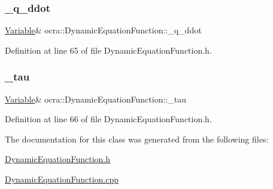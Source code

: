 \subsubsection{\texorpdfstring{\+\_\+q\+\_\+ddot}{\_q\_ddot}}
{\footnotesize\ttfamily \hyperlink{classocra_1_1Variable}{Variable}\& ocra\+::\+Dynamic\+Equation\+Function\+::\+\_\+q\+\_\+ddot\hspace{0.3cm}{\ttfamily [protected]}}



Definition at line 65 of file Dynamic\+Equation\+Function.\+h.

\hypertarget{classocra_1_1DynamicEquationFunction_a60ba636a9028046969c5491ec7ed2f9e}{}\label{classocra_1_1DynamicEquationFunction_a60ba636a9028046969c5491ec7ed2f9e} 
\subsubsection{\texorpdfstring{\+\_\+tau}{\_tau}}
{\footnotesize\ttfamily \hyperlink{classocra_1_1Variable}{Variable}\& ocra\+::\+Dynamic\+Equation\+Function\+::\+\_\+tau\hspace{0.3cm}{\ttfamily [protected]}}



Definition at line 66 of file Dynamic\+Equation\+Function.\+h.



The documentation for this class was generated from the following files\+:\begin{DoxyCompactItemize}
\item 
\hyperlink{DynamicEquationFunction_8h}{Dynamic\+Equation\+Function.\+h}\item 
\hyperlink{DynamicEquationFunction_8cpp}{Dynamic\+Equation\+Function.\+cpp}\end{DoxyCompactItemize}
